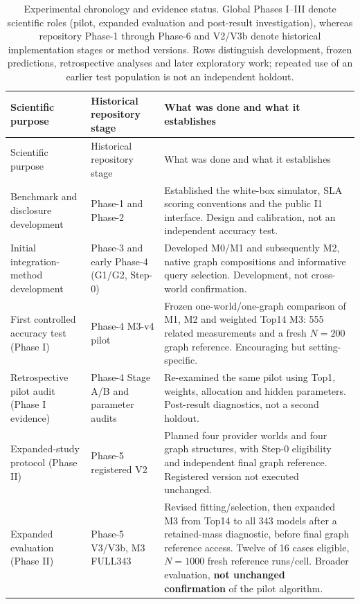 \documentclass[10pt,a4paper]{article}
\begin{document}
\begingroup\small\setlength{\tabcolsep}{3pt}
\begin{longtable}{@{}L{0.21\textwidth}L{0.22\textwidth}p{0.52\textwidth}@{}}
\caption{Experimental chronology and evidence status. Global Phases I--III denote scientific roles (pilot, expanded evaluation and post-result investigation), whereas repository Phase-1 through Phase-6 and V2/V3b denote historical implementation stages or method versions. Rows distinguish development, frozen predictions, retrospective analyses and later exploratory work; repeated use of an earlier test population is not an independent holdout.}\label{tab:experiment-chronology}\\
\toprule
Scientific purpose & Historical repository stage & What was done and what it establishes \\
\midrule
\endfirsthead
\toprule
Scientific purpose & Historical repository stage & What was done and what it establishes \\
\midrule
\endhead
Benchmark and disclosure development & Phase-1 and Phase-2 & Established the white-box simulator, SLA scoring conventions and the public I1 interface. Design and calibration, not an independent accuracy test. \\
Initial integration-method development & Phase-3 and early Phase-4 (G1/G2, Step-0) & Developed M0/M1 and subsequently M2, native graph compositions and informative query selection. Development, not cross-world confirmation. \\
First controlled accuracy test (Phase I) & Phase-4 M3-v4 pilot & Frozen one-world/one-graph comparison of M1, M2 and weighted Top14 M3: 555 related measurements and a fresh $N=200$ graph reference. Encouraging but setting-specific. \\
Retrospective pilot audit (Phase I evidence) & Phase-4 Stage A/B and parameter audits & Re-examined the same pilot using Top1, weights, allocation and hidden parameters. Post-result diagnostics, not a second holdout. \\
Expanded-study protocol (Phase II) & Phase-5 registered V2 & Planned four provider worlds and four graph structures, with Step-0 eligibility and independent final graph reference. Registered version not executed unchanged. \\
Expanded evaluation (Phase II) & Phase-5 V3/V3b, M3 FULL343 & Revised fitting/selection, then expanded M3 from Top14 to all 343 models after a retained-mass diagnostic, before final graph reference access. Twelve of 16 cases eligible, $N=1000$ fresh reference runs/cell. Broader evaluation, \textbf{not unchanged confirmation} of the pilot algorithm. \\

\end{longtable}
\end{document}

